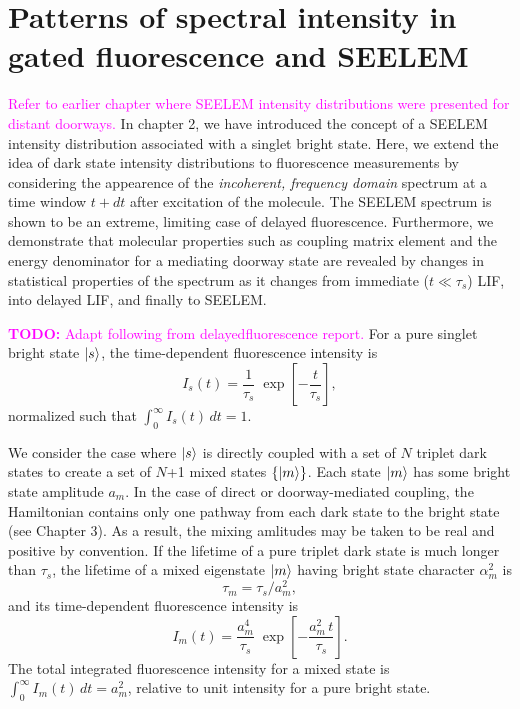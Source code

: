 \documentclass[12pt]{mitthesis}
\newcommand{\TODO} [1]{\textcolor{magenta}{\textbf{TODO:} #1}}
\newcommand{\POINT}[1]{\textcolor{magenta}{#1}}
\begin{document}
\section{Patterns of spectral intensity in gated fluorescence and
  SEELEM}

\POINT{Refer to earlier chapter where SEELEM intensity distributions
  were presented for distant doorways.}  In chapter 2, we have
introduced the concept of a SEELEM intensity distribution associated
with a singlet bright state.  Here, we extend the idea of dark state
intensity distributions to fluorescence measurements by considering
the appearence of the \emph{incoherent, frequency domain} spectrum at
a time window $t+dt$ after excitation of the molecule.  The SEELEM
spectrum is shown to be an extreme, limiting case of delayed
fluorescence.  Furthermore, we demonstrate that molecular properties
such as coupling matrix element and the energy denominator for a
mediating doorway state are revealed by changes in statistical
properties of the spectrum as it changes from immediate ($t\ll\tau_s$)
LIF, into delayed LIF, and finally to SEELEM.

\TODO{Adapt following from delayedfluorescence report.}  For a pure
singlet bright state $\mathinner{|{s}\rangle}$, the time-dependent fluorescence
intensity is
\begin{equation}
  I_s(t) = \frac{1}{\tau_s} \;
           \exp \left[
             -\frac{t}{ \tau_s} 
           \right],
\end{equation}
normalized such that $\int_0^{\infty} I_s(t) \, dt = 1$.

We consider the case where $\mathinner{|{s}\rangle}$ is directly coupled with a set of
$N$ triplet dark states to create a set of $N$+1 mixed states
$\lbrace\mathinner{|{m}\rangle}\rbrace$.  Each state $\mathinner{|{m}\rangle}$ has some bright state
amplitude $a_m$.  In the case of direct or doorway-mediated coupling,
the Hamiltonian contains only one pathway from each dark state to the
bright state (see Chapter 3).  As a result, the mixing amlitudes may
be taken to be real and positive by convention.  If the lifetime of a
pure triplet dark state is much longer than $\tau_s$, the lifetime of
a mixed eigenstate $\mathinner{|{m}\rangle}$ having bright state character
$\alpha_m^2$ is
\begin{equation}
  \label{eq:tau-m}
  \tau_m = \tau_s / a_m^2,
\end{equation}
and its time-dependent fluorescence intensity is
\begin{equation}
  \label{eq:int-m}
  I_m(t) = \frac{a_m^4}{\tau_s} \;
           \exp \left[
             -\frac{a_m^2 \, t}{\tau_s} 
           \right].
\end{equation}
The total integrated fluorescence intensity for a mixed state is
$\int_0^{\infty} I_m(t) \, dt = a_m^2$, relative to unit intensity for
a pure bright state.
\end{document}
